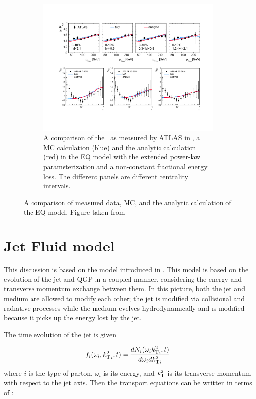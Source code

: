 \begin{figure}
\begin{subfigure}{1\textwidth}
\includegraphics[width=1\textwidth]{figures/jetMeasurements/eq_FF}
\caption{A comparison of the \Rdz\ as measured by ATLAS in \cite{Aad:2014wha}, a MC calculation (blue) and the analytic calculation (red) in the EQ model with the extended power-law parameterization and a non-constant fractional energy loss. The different panels are different centrality intervals.}
\label{fig:EQ_FF}
\end{subfigure}
\caption{A comparison of measured data, MC, and the analytic calculation of the EQ model. Figure taken from \cite{Spousta:2015fca}}
\label{fig:EQ_modification}
\end{figure}




\section{Jet Fluid model}
This discussion is based on the model introduced in \cite{Tachibana:2017syd}. This model is based on the evolution of the jet and QGP in a coupled manner, considering the energy and transverse momentum exchange between them. In this picture, both the jet and medium are allowed to modify each other; the jet is modified via collisional and radiative processes while the medium evolves hydrodynamically and is modified because it picks up the energy lost by the jet. 

The time evolution of the jet is given 

\begin{align}
f_i (\omega_i, \mbox{$k_{\rm T}^2$}_i, t) = \frac{dN_i (\omega_i \mbox{$k_{\rm T}^2$}_i, t)}{d \omega_i d\mbox{$k_{\rm T}^2$}_i}
\end{align}
where $i$ is the type of parton, $\omega_i$ is its energy, and $\mbox{$k_{\rm T}^2$}$ is its transverse momentum with respect to the jet axis. Then the transport equations can be written in terms of :

